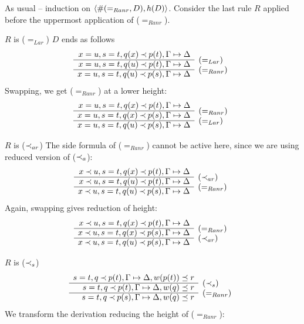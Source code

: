 \begin{PROOF}
As usual -- induction on $\langle\#(=_{Ranr},D),h(D)\rangle$. Consider the last rule
 $R$ applied before the uppermost application of ($=_{Ranr}$).
\begin{LS}
\item $R$ is ($=_{Lar}$) $D$ ends as follows
\[ \begin{array}{rl}
x=u, s=t, q(x)\Incl p(t), \GSD \\ \cline{1-1}
x=u, s=t, q(u)\Incl p(t), \GSD & \rabove{(=_{Lar})} \\ \cline{1-1}
x=u, s=t, q(u)\Incl p(s), \GSD & \rabove{(=_{Ranr})} \end{array} \]
Swapping, we get ($=_{Ranr}$) at a lower height:
\[ \begin{array}{rl}
x=u, s=t, q(x)\Incl p(t), \GSD \\ \cline{1-1}
x=u, s=t, q(x)\Incl p(s), \GSD & \rabove{(=_{Ranr})} \\ \cline{1-1}
x=u, s=t, q(u)\Incl p(s), \GSD & \rabove{(=_{Lar})} \end{array} \]
%
\item $R$ is ($\mathbin{\prec}_{ar}$) The side formula of ($=_{Ranr}$) cannot be active
here, since we are using reduced version of ($\mathbin{\prec}_a$):
\[ \begin{array}{rl}
x\Incl u, s=t, q(x)\Incl p(t), \GSD \\ \cline{1-1}
x\Incl u, s=t, q(u)\Incl p(t), \GSD & \rabove{(\Incl_{ar})} \\ \cline{1-1}
x\Incl u, s=t, q(u)\Incl p(s), \GSD & \rabove{(=_{Ranr})} \end{array} \]
Again, swapping gives reduction of height:
\[ \begin{array}{rl}
x\Incl u, s=t, q(x)\Incl p(t), \GSD \\ \cline{1-1}
x\Incl u, s=t, q(x)\Incl p(s), \GSD & \rabove{(=_{Ranr})} \\ \cline{1-1}
x\Incl u, s=t, q(u)\Incl p(s), \GSD & \rabove{(\Incl_{ar})} \end{array} \]
%
\item $R$ is ($\mathbin{\prec}_{s}$)
\[ \begin{array}{rl}
s=t, q\Incl p(t), \GSD, w(p(t))\preceq r \\ \cline{1-1}
s=t, q\Incl p(t), \GSD, w(q)\preceq r & \rabove{(\Incl_s)} \\ \cline{1-1}
s=t, q\Incl p(s), \GSD, w(q)\preceq r & \rabove{(=_{Ranr})} \end{array} \]
We transform the derivation reducing the height of ($=_{Ranr}$):

\end{LS}
\end{PROOF}

